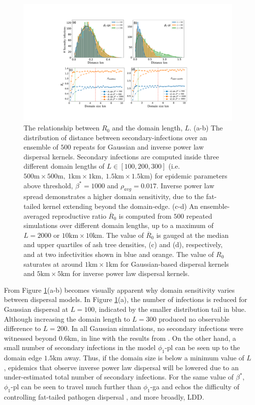 \begin{figure}
    \centering
    \includegraphics[scale=0.42]{chapter6/figures/fig5-R0-domain-size.pdf}
    \caption{The relationship between $R_0$ and the domain length, $L$. (a-b) The distribution of distance between secondary-infections over an ensemble of $500$ repeats for Gaussian and inverse power law dispersal kernels.
    Secondary infections are computed inside three different domain lengths of $L \in [100, 200, 300]$ (i.e. $\mathrm{500m\times500m,\ 1km\times1km,\ 1.5km\times1.5km}$) for epidemic parameters above threshold, $\beta^*=1000$ and $\rho_{avg} = 0.017$. Inverse power law spread demonstrates a higher domain sensitivity, due to the fat-tailed kernel extending beyond the domain-edge. (c-d) An ensemble-averaged reproductive ratio $\overline{R}_0$ is computed from $500$ repeated simulations over different domain lengths, up to a maximum of $L=2000$ or $\mathrm{10km \times 10km}$. The value of $\overline{R}_0$ is gauged at the median and upper quartiles of ash tree densities, (c) and (d), respectively, and at two infectivities shown in blue and orange. The value of $R_0$ saturates at around $\mathrm{1km\times1km}$ for Gaussian-based dispersal kernels and $\mathrm{5km\times5 km}$ for inverse power law dispersal kernels.}
    
    \label{fig:r0-domain-size}
\end{figure}

From Figure \ref{fig:r0-domain-size}(a-b) becomes visually apparent why domain sensitivity varies between dispersal models.
In Figure \ref{fig:r0-domain-size}(a), the number of infections is reduced for Gaussian dispersal at $L=100$, indicated by the smaller distribution tail in blue.
Although increasing the domain length to $L=300$ produced no observable difference to $L=200$.
In all Gaussian simulations, no secondary infections were witnessed beyond $0.6\mathrm{km}$, in line with the results from \cite{grosdidier2018tracking}. 
On the other hand, a small number of secondary infections in the model $\phi_1$-pl can be seen up to the domain edge $1.5\mathrm{km}$ away.
Thus, if the domain size is below a minimum value of $L$, epidemics that observe inverse power law dispersal will be lowered due to an under-estimated total number of secondary infections.
For the same value of $\beta^*$, $\phi_1$-pl can be seen to travel much further than $\phi_1$-ga and echos the difficulty of controlling fat-tailed pathogen dispersal \cite{WEBIDEMICS}, and more broadly, LDD.

